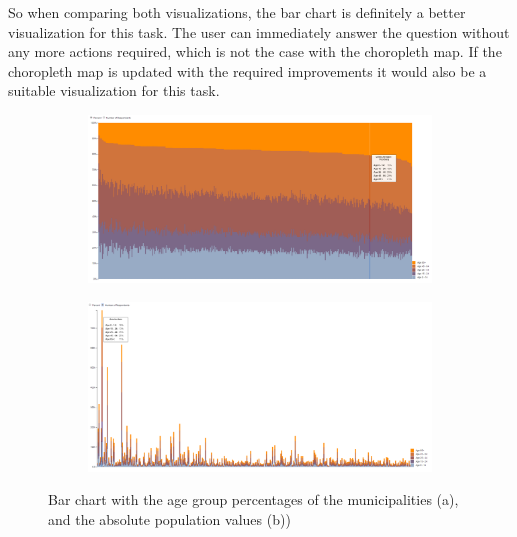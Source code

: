 So when comparing both visualizations, the bar chart is definitely a better visualization for this task.
The user can immediately answer the question without any more actions required, which is not the case with the choropleth map.
If the choropleth map is updated with the required improvements it would also be a suitable visualization for this task.

\begin{figure}[h!]
    \centering
    \captionsetup{justification=centering,margin=0.5cm}
    \begin{subfigure}[t]{0.48\textwidth}
        \includegraphics[width=\textwidth]{img/normalizedbarchart.png}
        \caption{ }
    \end{subfigure}
    \begin{subfigure}[t]{0.48\textwidth}
        \includegraphics[width=\textwidth]{img/normalbarchart.png}
        \caption{ }
    \end{subfigure}
    \caption{Bar chart with the age group percentages of the municipalities (a), and the absolute population values (b))}
    \label{fig:bar}
\end{figure}

